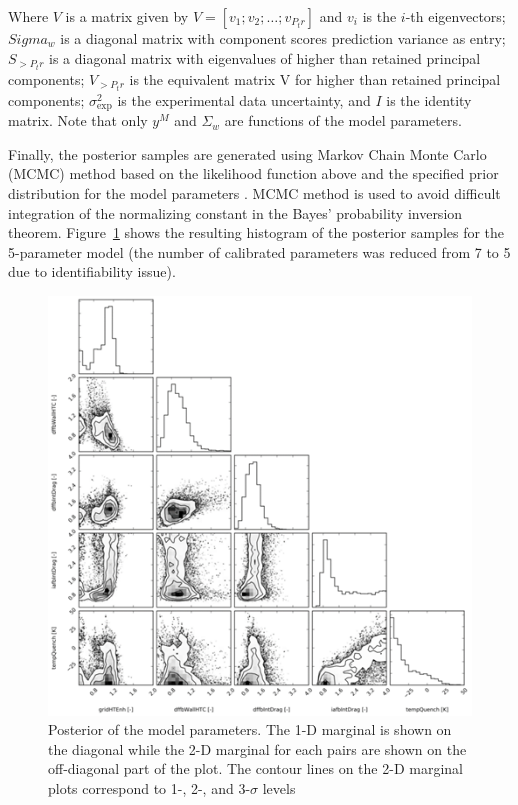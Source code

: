 \documentclass[11pt,titlepage]{article}
\begin{document}
Where $V$ is a matrix given by $V=[v_1;v_2;\dots;v_{P_tr}]$ and $v_i$ is 
the $i$-th eigenvectors; $Sigma_w$ is a diagonal matrix with component 
scores prediction variance as entry;  $S_{>P_tr}$ is a diagonal matrix 
with eigenvalues of higher than retained principal components; 
$V_{>P_tr}$ is the equivalent matrix V for higher than retained 
principal components; $\sigma_\text{exp}^2$ is the experimental data 
uncertainty, and $I$ is the identity matrix. 
Note that only $y^M$ and $\Sigma_w$ are functions of the model parameters.

Finally, the posterior samples are generated using Markov Chain Monte Carlo 
(MCMC) method \cite{Foreman-Mackey2013} based on the likelihood function 
above and the specified prior distribution for the model parameters 
\cite{Wicaksono2016}. 
MCMC method is used to avoid difficult integration of the normalizing 
constant in the Bayes’ probability inversion theorem. 
Figure~\ref{fig:mcmc} shows the resulting histogram of the posterior samples for 
the 5-parameter model 
(the number of calibrated parameters was reduced from 7 to 5 due to 
identifiability issue).

\begin{figure}[h!]
	\centering
	\includegraphics[scale=0.95]{figures/mcmc.png}
	\caption{Posterior of the model parameters. The 1-D marginal is shown on 
	    the diagonal while the 2-D marginal for each pairs are shown on the 
	    off-diagonal part of the plot. The contour lines on the 2-D marginal
	    plots correspond to 1-, 2-, and 3-$\sigma$ levels}
	\label{fig:mcmc}
\end{figure}
\end{document}
